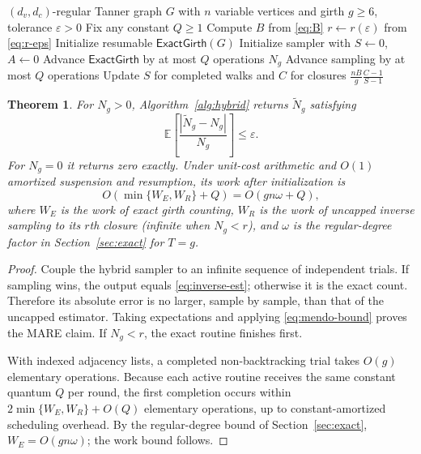 \documentclass[conference]{IEEEtran}
\newtheorem{theorem}{Theorem}
\begin{document}
\begin{algorithm}[t]
\caption{Interleaved hybrid $g$-cycle counting}
\label{alg:hybrid}
\footnotesize
\begin{algorithmic}[1]
\Require $(d_v,d_c)$-regular Tanner graph $G$ with $n$ variable vertices and girth
$g\ge6$, tolerance $\varepsilon>0$
\State Fix any constant $Q\ge1$
\State Compute $B$ from \eqref{eq:B}
\State $r\gets r(\varepsilon)$ from \eqref{eq:r-eps}
\State Initialize resumable $\mathsf{ExactGirth}(G)$
\State Initialize sampler with $S\gets0$, $A\gets0$
  \State Advance $\mathsf{ExactGirth}$ by at most $Q$ operations
    \State \Return $N_g$
  \EndIf
  \State Advance sampling by at most $Q$ operations
  \State Update $S$ for completed walks and $C$ for closures
 \State \Return $\frac{nB}{g}\frac{C-1}{S-1}$
  \EndIf
\EndWhile
\end{algorithmic}
\end{algorithm}
\begin{theorem}\label{thm:hybrid}
For $N_g>0$, Algorithm~\ref{alg:hybrid} returns
$\widetilde N_g$ satisfying
\[
 \mathbb E\!\left[
  \frac{|\widetilde N_g-N_g|}{N_g}\right]
 \le\varepsilon.
\]
For $N_g=0$ it returns zero exactly. Under unit-cost
arithmetic and $O(1)$ amortized suspension and resumption,
its work after initialization is
\[
 O\!\left(\min\{W_E,W_R\}+Q\right)
 =O(gn\omega+Q),
\]
where $W_E$ is the work of exact girth counting,
$W_R$ is the work of uncapped inverse sampling to its
$r$th closure (infinite when $N_g<r$), and
$\omega$ is the regular-degree factor in
Section~\ref{sec:exact} for $T=g$.
\end{theorem}
\begin{proof}
Couple the hybrid sampler to an infinite sequence of
independent trials. If sampling wins, the output equals
\eqref{eq:inverse-est}; otherwise it is the exact count.
Therefore its absolute error is no larger, sample by
sample, than that of the uncapped estimator.
Taking expectations and applying \eqref{eq:mendo-bound}
proves the MARE claim. If $N_g<r$, the exact routine finishes first.

With indexed adjacency lists, a completed non-backtracking trial takes
$O(g)$ elementary operations. Because each active routine
receives the same constant quantum $Q$ per round, the
first completion occurs within
$2\min\{W_E,W_R\}+O(Q)$ elementary operations, up to
constant-amortized scheduling overhead. By the regular-degree
bound of Section~\ref{sec:exact},
$W_E=O(gn\omega)$; the work bound follows.
\end{proof}
\end{document}
